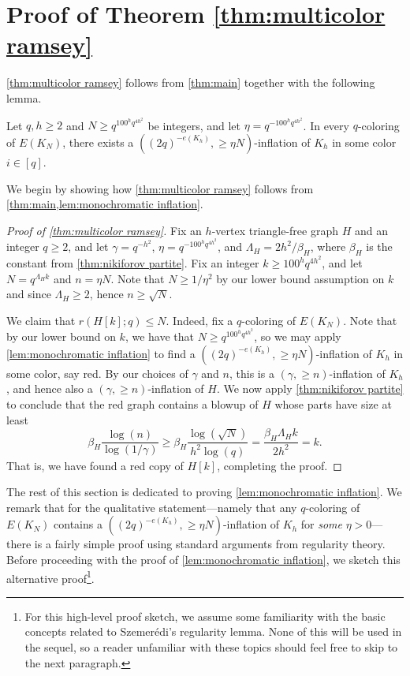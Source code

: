 \documentclass[11pt]{article}
\numberwithin{equation}{section}
\theoremstyle{plain}
\theoremstyle{remark}
\begin{document}
\section{Proof of Theorem \ref{thm:multicolor ramsey}}\label{sec:ramsey}

\cref{thm:multicolor ramsey} follows from \cref{thm:main} together with the following lemma.
\begin{lemma}\label{lem:monochromatic inflation}
    Let $q,h \geq 2$ and $N\geq q^{100^h q^{4h^2}}$ be integers, and let $\eta=q^{-100^h q^{4h^2}}$. In every $q$-coloring of $E(K_N)$, there exists a $((2q)^{-e(K_h)}, \geq \eta N)$-inflation of $K_h$ in some color $i \in [q]$.
\end{lemma}

We begin by showing how \cref{thm:multicolor ramsey} follows from \cref{thm:main,lem:monochromatic inflation}.
\begin{proof}[Proof of \cref{thm:multicolor ramsey}]
Fix an $h$-vertex triangle-free graph $H$ and an integer $q \geq 2$, and let $\gamma = q^{-h^2}$, $\eta = q^{-100^h q^{4h^2}}$, and $\Lambda_H=2h^2/\beta_H$, where $\beta_H$ is the constant from \cref{thm:nikiforov partite}. 
Fix an integer $k \geq 100^h q^{4h^2}$, and let $N = q^{\Lambda_H k}$ and $n = \eta N$. Note that $N \geq 1/\eta^2$ by our lower bound assumption on $k$ and since $\Lambda_H \geq 2$, hence $n \geq \sqrt N$.

We claim that $r(H[k];q) \leq N$. Indeed,
fix a $q$-coloring of $E(K_N)$. Note that by our lower bound on $k$, we have that $N \geq q^{100^h q^{4h^2}}$, so we may apply \cref{lem:monochromatic inflation} to find a $((2q)^{-e(K_h)}, \geq \eta N)$-inflation of $K_h$ in some color, say red. By our choices of $\gamma$ and $n$, this is a $(\gamma, \geq n)$-inflation of $K_h$, and hence also a $(\gamma, \geq n)$-inflation of $H$. We now apply \cref{thm:nikiforov partite} to conclude that the red graph contains a blowup of $H$ whose parts have size at least
\[
\beta_H \frac{\log(n)}{\log(1/\gamma)} \geq \beta_H\frac{\log(\sqrt N)}{h^2 \log(q)} =\frac{\beta_H \Lambda_H k}{2h^2} = k.
\]
That is, we have found a red copy of $H[k]$, completing the proof.
\end{proof}


The rest of this section is dedicated to proving \cref{lem:monochromatic inflation}. We remark that for the qualitative statement---namely that any $q$-coloring of $E(K_N)$ contains a $((2q)^{-e(K_h)}, \geq\eta N)$-inflation of $K_h$ for \emph{some} $\eta>0$---there is a fairly simple proof using standard arguments from regularity theory. Before proceeding with the proof of \cref{lem:monochromatic inflation}, we sketch this alternative proof\footnote{For this high-level proof sketch, we assume some familiarity with the basic concepts related to Szemer\'edi's regularity lemma. None of this will be used in the sequel, so a reader unfamiliar with these topics should feel free to skip to the next paragraph.}.
\end{document}
